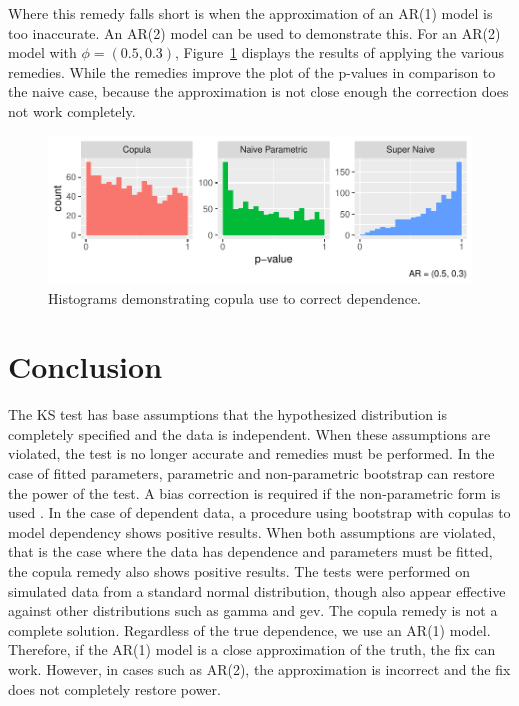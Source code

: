 \documentclass[12pt, letterpaper, titlepage]{article}
\begin{document}
Where this remedy falls short is when the approximation of an AR(1) model is too inaccurate.
An AR(2) model can be used to demonstrate this. For an AR(2) model with $\phi = (0.5, 0.3)$,
Figure~\ref{fig:hist_copula_ar2} displays the results of applying the various remedies. 
While the remedies improve the plot of the p-values in comparison to the naive case,
because the approximation is not close enough the correction does not work completely.

\begin{figure}[tbp]
  \centering
  \includegraphics{hist_copula_ar2}
  \caption{Histograms demonstrating copula use to correct dependence.}
  \label{fig:hist_copula_ar2}
\end{figure}


\section{Conclusion}\label{sec:conclusion}

The KS test has base assumptions that the hypothesized distribution is completely specified
and the data is independent. When these assumptions are violated, the test is no
longer accurate and remedies must be performed. In the case of fitted parameters, 
parametric and non-parametric bootstrap can restore the power of the test. A bias 
correction is required if the non-parametric form is used \citep{Babu}. In the case of dependent
data, a procedure using bootstrap with copulas to model dependency shows positive results.
When both assumptions are violated, that is the case where the data has dependence and 
parameters must be fitted, the copula remedy also shows positive results. The tests were 
performed on simulated data from a standard normal distribution, though also appear effective
against other distributions such as gamma and gev. The copula remedy
is not a complete solution. Regardless of the true dependence, we use an AR(1) model.
Therefore, if the AR(1) model is a close approximation of the truth, the fix can work.
However, in cases such as AR(2), the approximation is incorrect and the fix does not 
completely restore power.




\end{document}
